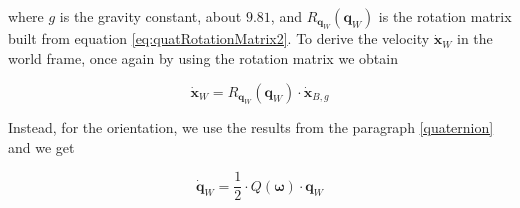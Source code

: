 \noindent  where $g$ is the gravity constant, about $9.81$, and $R_{\mathbf{q}_W}(\mathbf{q}_W)$ is the rotation matrix built from equation \eqref{eq:quatRotationMatrix2}. To derive the velocity $\dot{\mathbf{x}}_W$ in the world frame, once again by using the rotation matrix we obtain

\begin{equation}
	\dot{\mathbf{x}}_W = R_{\mathbf{q}_W}(\mathbf{q}_W)\cdot\dot{\mathbf{x}}_{B, g}
	\label{eq:velocityWorld}
\end{equation}

\noindent Instead, for the orientation, we use the results from the paragraph \ref{quaternion} and we get

\begin{equation}
	\dot{\mathbf{q}}_W = \frac{1}{2}\cdot Q(\boldsymbol{\omega})\cdot\mathbf{q}_W
	\label{eq:orientation}
\end{equation}

